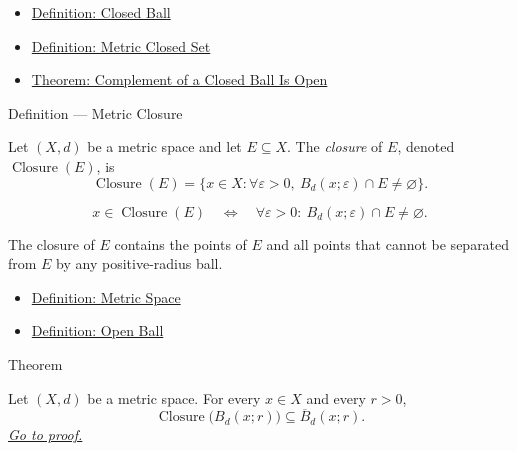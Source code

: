 \begin{dependencies}
\begin{itemize}
  \item \hyperref[def:metric-closed-ball]{Definition: Closed Ball}
  \item \hyperref[def:metric-closed-set]{Definition: Metric Closed Set}
  \item \hyperref[thm:metric-complement-closed-ball-open]{Theorem: Complement of a Closed Ball Is Open}
\end{itemize}
\end{dependencies}

\begin{definitionbox}{Definition --- Metric Closure}
\begin{definition}\label{def:metric-closure}
Let \((X,d)\) be a metric space and let \(E\subseteq X\).  The
\emph{closure} of \(E\), denoted \(\operatorname{Closure}(E)\), is
\[
  \operatorname{Closure}(E)
  =
  \{x\in X:\forall\varepsilon>0,\ B_d(x;\varepsilon)\cap E\neq\varnothing\}.
\]
\end{definition}
\end{definitionbox}

\begin{remark*}
\[
x\in\operatorname{Closure}(E)
\quad\Longleftrightarrow\quad
\forall\varepsilon>0{:}\ B_d(x;\varepsilon)\cap E\neq\varnothing.
\]
\end{remark*}

\begin{remark*}[Interpretation]
The closure of \(E\) contains the points of \(E\) and all points that cannot
be separated from \(E\) by any positive-radius ball.
\end{remark*}

\begin{dependencies}
\begin{itemize}
  \item \hyperref[def:metric-space]{Definition: Metric Space}
  \item \hyperref[def:metric-open-ball]{Definition: Open Ball}
\end{itemize}
\end{dependencies}

\begin{theorembox}{Theorem}
\begin{theorem}
\label{thm:metric-closure-open-ball-contained-closed-ball}
Let \((X,d)\) be a metric space.  For every \(x\in X\) and every \(r>0\),
\[
  \operatorname{Closure}\bigl(B_d(x;r)\bigr)\subseteq \overline{B}_d(x;r).
\]
\hyperref[prf:metric-closure-open-ball-contained-closed-ball]{\textit{Go to proof.}}
\end{theorem}
\end{theorembox}

